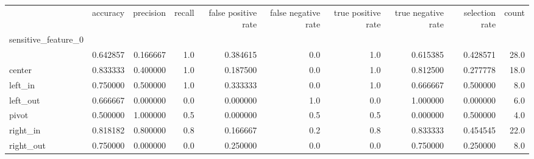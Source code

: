 \begin{tabular}{lrrrrrrrrr}
\toprule
{} &  accuracy &  precision &  recall &  false positive rate &  false negative rate &  true positive rate &  true negative rate &  selection rate &  count \\
sensitive\_feature\_0 &           &            &         &                      &                      &                     &                     &                 &        \\
\midrule
                    &  0.642857 &   0.166667 &     1.0 &             0.384615 &                  0.0 &                 1.0 &            0.615385 &        0.428571 &   28.0 \\
center              &  0.833333 &   0.400000 &     1.0 &             0.187500 &                  0.0 &                 1.0 &            0.812500 &        0.277778 &   18.0 \\
left\_in             &  0.750000 &   0.500000 &     1.0 &             0.333333 &                  0.0 &                 1.0 &            0.666667 &        0.500000 &    8.0 \\
left\_out            &  0.666667 &   0.000000 &     0.0 &             0.000000 &                  1.0 &                 0.0 &            1.000000 &        0.000000 &    6.0 \\
pivot               &  0.500000 &   1.000000 &     0.5 &             0.000000 &                  0.5 &                 0.5 &            0.000000 &        0.500000 &    4.0 \\
right\_in            &  0.818182 &   0.800000 &     0.8 &             0.166667 &                  0.2 &                 0.8 &            0.833333 &        0.454545 &   22.0 \\
right\_out           &  0.750000 &   0.000000 &     0.0 &             0.250000 &                  0.0 &                 0.0 &            0.750000 &        0.250000 &    8.0 \\
\bottomrule
\end{tabular}
